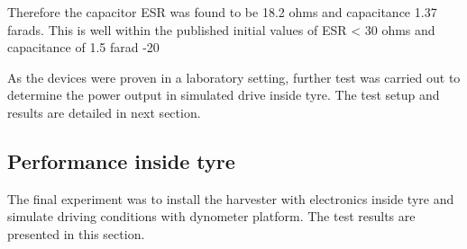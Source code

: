 Therefore the capacitor ESR was found to be 18.2 ohms and capacitance 1.37 farads. This is well within the published initial values of ESR < 30 ohms and capacitance of 1.5 farad -20 %

As the devices were proven in a laboratory setting, further test was carried out to determine the power output in simulated drive inside tyre. The test setup and results are detailed in next section.

\subsection{Performance inside tyre}
The final experiment was to install the harvester with electronics inside tyre and simulate driving conditions with dynometer platform. The test results are presented in this section. 



